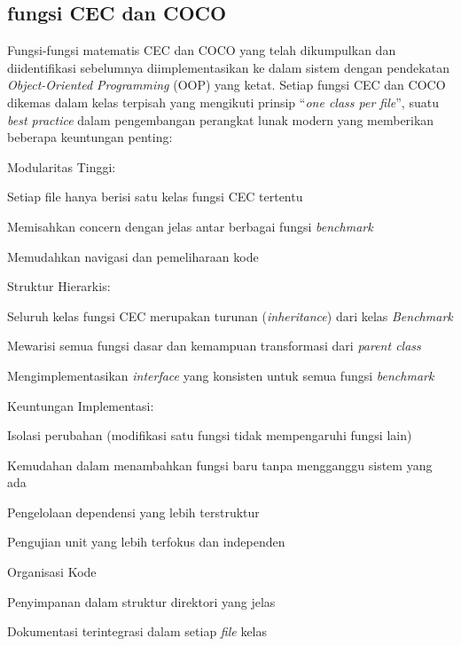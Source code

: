 \subsection{fungsi CEC dan COCO}
Fungsi-fungsi matematis CEC dan COCO yang telah dikumpulkan dan diidentifikasi sebelumnya diimplementasikan ke dalam sistem dengan pendekatan \textit{Object-Oriented Programming} (OOP) yang ketat. Setiap fungsi CEC dan COCO dikemas dalam kelas terpisah yang mengikuti prinsip \foreignlanguage{english}{\enquote{\textit{one class per file}}}, suatu \textit{best practice} dalam pengembangan perangkat lunak modern yang memberikan beberapa keuntungan penting:
\begin{packed_enum}
	\item Modularitas Tinggi:
    \begin{packed_enum}
      \item Setiap file hanya berisi satu kelas fungsi CEC tertentu
      \item Memisahkan concern dengan jelas antar berbagai fungsi \textit{benchmark}
      \item Memudahkan navigasi dan pemeliharaan kode
    \end{packed_enum}
	\item Struktur Hierarkis:
    \begin{packed_enum}
      \item Seluruh kelas fungsi CEC merupakan turunan (\textit{inheritance}) dari kelas \textit{Benchmark}
      \item Mewarisi semua fungsi dasar dan kemampuan transformasi dari \textit{parent class} 
      \item Mengimplementasikan \textit{interface} yang konsisten untuk semua fungsi \textit{benchmark}
    \end{packed_enum}
	\item Keuntungan Implementasi:
    \begin{packed_enum}
      \item Isolasi perubahan (modifikasi satu fungsi tidak mempengaruhi fungsi lain)
      \item Kemudahan dalam menambahkan fungsi baru tanpa mengganggu sistem yang ada 
      \item Pengelolaan dependensi yang lebih terstruktur
      \item Pengujian unit yang lebih terfokus dan independen
    \end{packed_enum}
	\item Organisasi Kode
	\item Penyimpanan dalam struktur direktori yang jelas
	\item Dokumentasi terintegrasi dalam setiap \textit{file} kelas
\end{packed_enum}
